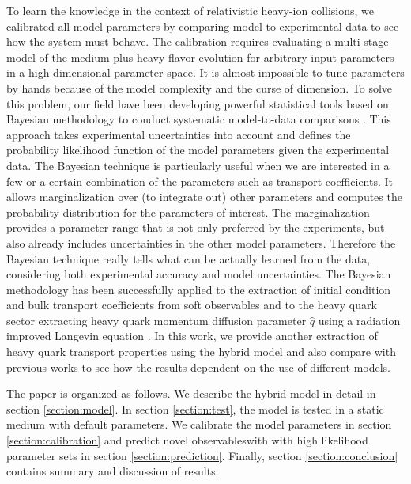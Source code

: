 \documentclass[aps, prc, reprint, amsmath, groupedaddress, nofootinbib]{revtex4-1}
\begin{document}
To learn the knowledge in the context of relativistic heavy-ion collisions, we calibrated all model parameters by comparing model to experimental data to see how the system must behave.
The calibration requires evaluating a multi-stage model of the medium plus heavy flavor evolution for arbitrary input parameters in a high dimensional parameter space.
It is almost impossible to tune parameters by hands because of the model complexity and the curse of dimension.
To solve this problem, our field have been developing powerful statistical tools based on Bayesian methodology to conduct systematic model-to-data comparisons \cite{Novak:2013bqa,Bernhard:2015hxa}.
This approach takes experimental uncertainties into account and defines the probability likelihood function of the model parameters given the experimental data.
The Bayesian technique is particularly useful when we are interested in a few or a certain combination of the parameters such as transport coefficients.
It allows marginalization over (to integrate out) other parameters and computes the probability distribution for the parameters of interest. 
The marginalization provides a parameter range that is not only preferred by the experiments, but also already includes uncertainties in the other model parameters.
Therefore the Bayesian technique really tells what can be actually learned from the data, considering both experimental accuracy and model uncertainties.
The Bayesian methodology has been successfully applied to the extraction of initial condition and bulk transport coefficients from soft observables \cite{Novak:2013bqa, Pratt:2015zsa, Bernhard:2015hxa, Bernhard:2016tnd, Auvinen:2017fjw} and to the heavy quark sector extracting heavy quark momentum diffusion parameter $\hat{q}$ using a radiation improved Langevin equation \cite{Xu:2017obm, Cao:2013ita}.
In this work, we provide another extraction of heavy quark transport properties using the hybrid model and also compare with previous works to see how the results dependent on the use of different models.

The paper is organized as follows. 
We describe the hybrid model in detail in section \ref{section:model}. In section \ref{section:test}, the model is tested in a static medium with default parameters. 
We calibrate the model parameters in section \ref{section:calibration} and predict novel observableswith with high likelihood parameter sets in section \ref{section:prediction}. 
Finally, section \ref{section:conclusion} contains summary and discussion of results.
\end{document}
